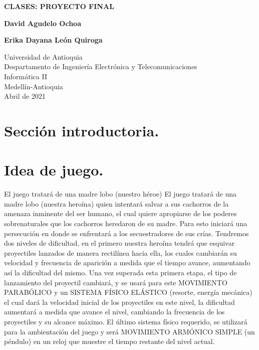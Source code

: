 \documentclass{article}
\begin{document}
\begin{titlepage}
    \begin{center}
        \vspace*{0cm}
            
        \large
        \textbf{CLASES: PROYECTO FINAL}
            

        \vspace{8cm}
            
        \textbf{David Agudelo Ochoa}
        
        \vspace{0.5cm}
        
        \textbf{Erika Dayana León Quiroga}
            
        \vfill
            
        \vspace{0.8cm}
            
        \Large
        Universidad de Antioquia\\
        Despartamento de Ingeniería Electrónica y Telecomunicaciones\\
        Informática II\\
        Medellín-Antioquia\\
        Abril de 2021
            
    \end{center}
\end{titlepage}

\tableofcontents
\newpage
\section{Sección introductoria.}\label{intro}

\section{Idea de juego.}\label{integrado}
El juego tratará de una madre lobo (nuestro héroe)
El juego tratará de una madre lobo (nuestra heroína) quien intentará salvar a sus cachorros de la amenaza inminente del ser humano, el cual quiere apropiarse de los poderes sobrenaturales que los cachorros heredaron de su madre. Para esto iniciará una persecución en donde se enfrentará a los secuestradores de sus crías. Tendremos dos niveles de dificultad, en el primero nuestra heroína tendrá que esquivar proyectiles lanzados de manera rectilínea hacia ella, los cuales cambiarán su velocidad y frecuencia de aparición a medida que el tiempo avance, aumentando así la dificultad del mismo. Una vez superada esta primera etapa, el tipo de lanzamiento del proyectil cambiará, y se usará para este MOVIMIENTO PARABÓLICO y un SISTEMA FÍSICO ELÁSTICO (resorte, energía mecánica) el cual dará la velocidad inicial de los proyectiles en este nivel, la dificultad aumentará a medida que avance el nivel, cambiando la frecuencia de los proyectiles y su alcance máximo.
El último sistema físico requerido, se utilizará para la ambientación del juego y será MOVIMIENTO ARMÓNICO SIMPLE (un péndulo) en un reloj que muestre el tiempo restante del nivel actual.
\end{document}
